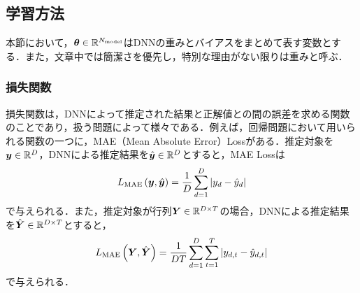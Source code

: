 \subsection{学習方法}
本節において，$\bm{\theta} \in \mathbb{R}^{N_{\text{model}}}$はDNNの重みとバイアスをまとめて表す変数とする．また，文章中では簡潔さを優先し，特別な理由がない限りは重みと呼ぶ．

\subsubsection{損失関数}
損失関数は，DNNによって推定された結果と正解値との間の誤差を求める関数のことであり，扱う問題によって様々である．例えば，回帰問題において用いられる関数の一つに，MAE（Mean Absolute Error）Lossがある．推定対象を$\bm{y} \in \mathbb{R}^{D}$，DNNによる推定結果を$\hat{\bm{y}} \in \mathbb{R}^{D}$とすると，MAE Lossは
\begin{equation}
    L_{\text{MAE}}\left(\bm{y}, \hat{\bm{y}}\right) = \frac{1}{D} \sum_{d = 1}^{D}  |y_{d} - \hat{y}_{d}|
\end{equation}
で与えられる．また，推定対象が行列$\bm{Y} \in \mathbb{R}^{D \times T}$の場合，DNNによる推定結果を$\hat{\bm{Y}} \in \mathbb{R}^{D \times T}$とすると，
\begin{equation}
    L_{\text{MAE}}\left(\bm{Y}, \hat{\bm{Y}}\right) = \frac{1}{D T} \sum_{d = 1}^{D} \sum_{t = 1}^{T}  |y_{d, t} - \hat{y}_{d, t}|
\end{equation}
で与えられる．

